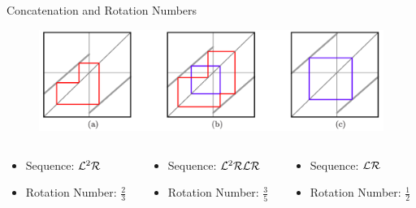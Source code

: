 \begin{frame}{Concatenation and Rotation Numbers}
	\begin{figure}
		\includegraphics[width=.8 \textwidth]{Figs/PeriodAddingCobwebs_Slides.png}
	\end{figure}
	\begin{columns}
		\begin{column}{.3 \textwidth}
			\begin{itemize}
				\item Sequence: $\mathcal{L}^2\mathcal{R}$
				\item Rotation Number: $\frac{2}{3}$
			\end{itemize}
		\end{column}
		\begin{column}{.3 \textwidth}
			\begin{itemize}
				\item Sequence: $\mathcal{L}^2\mathcal{R}\mathcal{L}\mathcal{R}$
				\item Rotation Number: $\frac{3}{5}$
			\end{itemize}
		\end{column}
		\begin{column}{.3 \textwidth}
			\begin{itemize}
				\item Sequence: $\mathcal{L}\mathcal{R}$
				\item Rotation Number: $\frac{1}{2}$
			\end{itemize}
		\end{column}
	\end{columns}
\end{frame}


